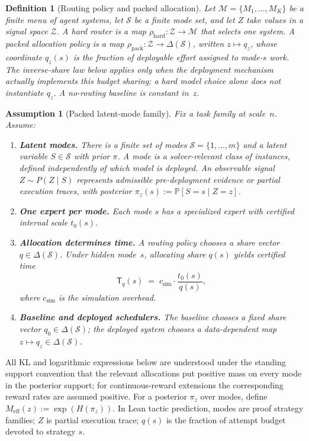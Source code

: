 \documentclass[10pt]{article}
\theoremstyle{paperplain}
\theoremstyle{paperdefinition}
\newtheorem{definition}[theorem]{Definition}
\newtheorem{assumption}[theorem]{Assumption}
\theoremstyle{paperremark}
\newcommand{\Prb}{\mathbb{P}}
\newcommand{\cS}{\mathcal{S}}
\newcommand{\cM}{\mathcal{M}}
\newcommand{\Meff}{M_{\mathrm{eff}}}
\begin{document}
\begin{definition}[Routing policy and packed allocation]
\label{def:routing-policy}
Let $\cM=\{M_1,\ldots,M_K\}$ be a finite menu of agent systems, let $\cS$ be a finite mode set, and let $Z$ take values in a signal space $\mathcal Z$.
A \emph{hard router} is a map $\rho_{\mathrm{hard}}:\mathcal Z\to\cM$ that selects one system.
A \emph{packed allocation policy} is a map $\rho_{\mathrm{pack}}:\mathcal Z\to\Delta(\cS)$, written $z\mapsto q_z$, whose coordinate $q_z(s)$ is the fraction of deployable effort assigned to mode-$s$ work.
The inverse-share law below applies only when the deployment mechanism actually implements this budget sharing; a hard model choice alone does not instantiate $q_z$.
A no-routing baseline is constant in~$z$.
\end{definition}

\begin{assumption}[Packed latent-mode family]
\label{def:packed-family}
\label{ass:packed-family}
Fix a task family at scale~$n$.
Assume:
\begin{enumerate}
\item \textbf{Latent modes.} There is a finite set of modes $\cS=\{1,\ldots,m\}$ and a latent variable $S \in \cS$ with prior $\pi$. A mode is a solver-relevant class of instances, defined independently of which model is deployed. An observable signal $Z \sim P(Z \mid S)$ represents admissible pre-deployment evidence or partial execution traces, with posterior $\pi_z(s) := \Prb[S = s \mid Z=z]$.
\item \textbf{One expert per mode.} Each mode $s$ has a specialized expert with certified internal scale $t_0(s)$.
\item \textbf{Allocation determines time.} A routing policy chooses a share vector $q \in \Delta(\cS)$.
Under hidden mode~$s$, allocating share $q(s)$ yields certified time
\[
\mathsf{T}_q(s) \;=\; c_{\mathrm{sim}} \cdot \frac{t_0(s)}{q(s)},
\]
where $c_{\mathrm{sim}}$ is the simulation overhead.
\item \textbf{Baseline and deployed schedulers.} The baseline chooses a fixed share vector $q_0 \in \Delta(\cS)$; the deployed system chooses a data-dependent map $z \mapsto q_z \in \Delta(\cS)$.
\end{enumerate}
\end{assumption}

All KL and logarithmic expressions below are understood under the standing support convention that the relevant allocations put positive mass on every mode in the posterior support; for continuous-reward extensions the corresponding reward rates are assumed positive. For a posterior $\pi_z$ over modes, define $\Meff(z) := \exp(H(\pi_z))$. In Lean tactic prediction, modes are proof strategy families; $Z$ is partial execution trace; $q(s)$ is the fraction of attempt budget devoted to strategy $s$.
\end{document}
